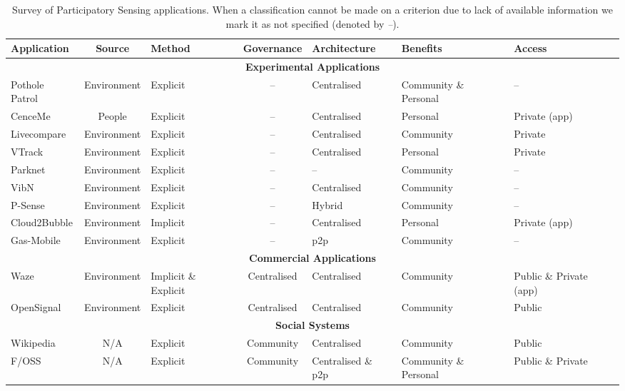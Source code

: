 \begin{table}
\centering
\caption[Survey of Participatory Sensing applications]{Survey of Participatory Sensing applications. When a classification cannot be made on a criterion due to lack of available information we mark it as not specified (denoted by \emph{--}).\label{table:litsurvey}}
\begin{tabularx}{\textwidth}{X|c|p{2.0cm}|c|p{2.1cm}|p{2.6cm}|p{2.3cm}}
\textbf{Application} & \textbf{Source} & \textbf{Method} & \textbf{Governance} & \textbf{Architecture} & \textbf{Benefits} & \textbf{Access} \\ \hline \hline
\multicolumn{7}{c}{\textbf{Experimental Applications}} \\
\hline 
Pothole Patrol \citep{Eriksson2008} & Environment & Explicit & -- & Centralised & Community \& Personal & -- \\
CenceMe \citep{Miluzzo2008} & People & Explicit & -- & Centralised & Personal & Private (app) \\
Livecompare \citep{Deng2009} & Environment & Explicit & -- & Centralised & Community & Private \\
VTrack \citep{Thiagarajan2009} & Environment & Explicit & -- & Centralised & Personal & Private \\
Parknet \citep{Mathur2010} & Environment & Explicit & -- & -- & Community & -- \\
VibN \citep{Miluzzo2011} & Environment & Explicit & -- & Centralised & Community & -- \\
P-Sense \citep{Mendez2011} & Environment & Explicit & -- & Hybrid & Community & -- \\
Cloud2Bubble \citep{Costa2012} & Environment & Implicit & -- & Centralised & Personal & Private (app) \\
Gas-Mobile \citep{Hasenfratz2012} & Environment & Explicit & -- & p2p & Community & -- \\

\hline \hline
\multicolumn{7}{c}{\textbf{Commercial Applications}} \\\hline
Waze & Environment & Implicit \& Explicit & Centralised & Centralised & Community & Public \& \newline Private (app) \\
OpenSignal & Environment & Explicit & Centralised & Centralised & Community & Public \\

\hline \hline
\multicolumn{7}{c}{\textbf{Social Systems}} \\\hline
Wikipedia & N/A & Explicit & Community & Centralised & Community & Public \\
F/OSS & N/A & Explicit & Community & Centralised \& p2p & Community \& Personal & Public \& \newline Private
\end{tabularx}
\end{table}

